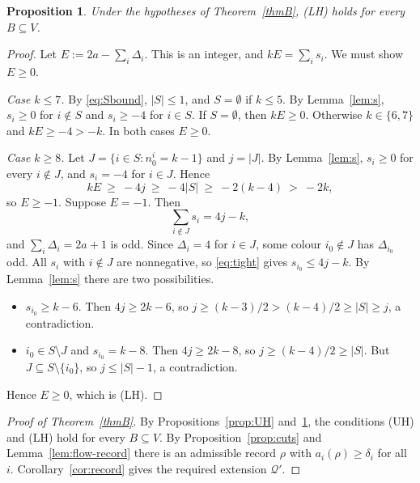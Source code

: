 \documentclass[11pt]{amsart}
\newtheorem{proposition}[theorem]{Proposition}
\theoremstyle{definition}
\theoremstyle{remark}
\newcommand{\Q}{\mathcal{Q}}
\begin{document}
\begin{proposition}\label{prop:LH}
Under the hypotheses of Theorem~\ref{thmB}, \textup{(LH)} holds for every $B\subseteq V$.
\end{proposition}

\begin{proof}
Let $E:=2a-\sum_i\Delta_i$. This is an integer, and $kE=\sum_is_i$. We must show $E\ge0$.

\emph{Case $k\le7$.} By \eqref{eq:Sbound}, $|S|\le1$, and $S=\emptyset$ if $k\le5$. By
Lemma~\ref{lem:s}, $s_i\ge0$ for $i\notin S$ and $s_i\ge-4$ for $i\in S$. If $S=\emptyset$,
then $kE\ge0$. Otherwise $k\in\{6,7\}$ and $kE\ge-4>-k$. In both cases $E\ge0$.

\emph{Case $k\ge8$.} Let $J=\{i\in S:n_0^i=k-1\}$ and $j=|J|$. By Lemma~\ref{lem:s},
$s_i\ge0$ for every $i\notin J$, and $s_i=-4$ for $i\in J$. Hence
\[
kE\ \ge\ -4j\ \ge\ -4|S|\ \ge\ -2(k-4)\ >\ -2k ,
\]
so $E\ge-1$. Suppose $E=-1$. Then
\begin{equation}\label{eq:tight}
\sum_{i\notin J}s_i=4j-k,
\end{equation}
and $\sum_i\Delta_i=2a+1$ is odd. Since $\Delta_i=4$ for $i\in J$, some colour $i_0\notin J$
has $\Delta_{i_0}$ odd. All $s_i$ with $i\notin J$ are nonnegative, so \eqref{eq:tight} gives
$s_{i_0}\le 4j-k$. By Lemma~\ref{lem:s} there are two possibilities.
\begin{itemize}[leftmargin=*]
\item $s_{i_0}\ge k-6$. Then $4j\ge 2k-6$, so $j\ge (k-3)/2>(k-4)/2\ge|S|\ge j$, a
contradiction.
\item $i_0\in S\setminus J$ and $s_{i_0}=k-8$. Then $4j\ge 2k-8$, so $j\ge(k-4)/2\ge|S|$. But
$J\subseteq S\setminus\{i_0\}$, so $j\le|S|-1$, a contradiction.
\end{itemize}
Hence $E\ge0$, which is (LH).
\end{proof}

\begin{proof}[Proof of Theorem~\ref{thmB}]
By Propositions~\ref{prop:UH} and~\ref{prop:LH}, the conditions (UH) and (LH) hold for every
$B\subseteq V$. By Proposition~\ref{prop:cuts} and Lemma~\ref{lem:flow-record} there is an
admissible record $\rho$ with $a_i(\rho)\ge\delta_i$ for all~$i$. Corollary~\ref{cor:record}
gives the required extension $\Q'$.
\end{proof}
\end{document}
